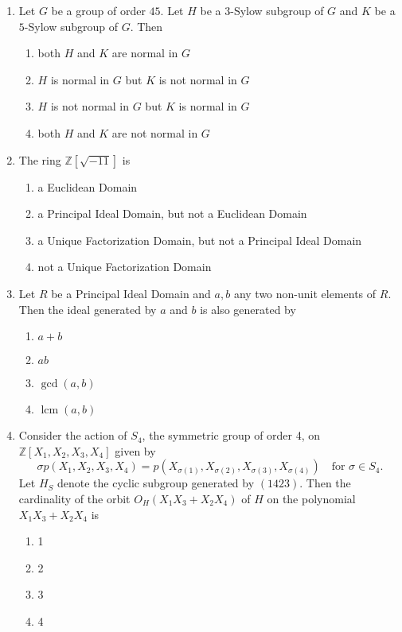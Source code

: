 \documentclass[journal]{IEEEtran}
\numberwithin{equation}{enumi}
\numberwithin{figure}{enumi}
\begin{document}
\begin{enumerate}
\item
Let $G$ be a group of order $45$. Let $H$ be a $3$-Sylow subgroup of $G$ and $K$ be a $5$-Sylow subgroup of $G$. Then
\hfill{}
\begin{enumerate}
    \item both $H$ and $K$ are normal in $G$
    \item $H$ is normal in $G$ but $K$ is not normal in $G$
    \item $H$ is not normal in $G$ but $K$ is normal in $G$
    \item both $H$ and $K$ are not normal in $G$
\end{enumerate}

\item
The ring $\mathbb{Z}[\sqrt{-11}]$ is
\hfill{}
\begin{enumerate}
    \item a Euclidean Domain
    \item a Principal Ideal Domain, but not a Euclidean Domain
    \item a Unique Factorization Domain, but not a Principal Ideal Domain
    \item not a Unique Factorization Domain
\end{enumerate}

\item
Let $R$ be a Principal Ideal Domain and $a, b$ any two non-unit elements of $R$. Then the ideal generated by $a$ and $b$ is also generated by
\hfill{}
\begin{multicols}{4}
\begin{enumerate}
    \item $a + b$
    \item $ab$
    \item $\gcd(a, b)$
    \item $\operatorname{lcm}(a, b)$
\end{enumerate}
\end{multicols}

\item
Consider the action of $S_4$, the symmetric group of order 4, on $\mathbb{Z}[X_1,X_2,X_3,X_4]$ given by
\[
\sigma p(X_1,X_2,X_3,X_4) = p(X_{\sigma(1)}, X_{\sigma(2)}, X_{\sigma(3)}, X_{\sigma(4)}) \quad \text{for } \sigma \in S_4.
\]
Let $H_S$ denote the cyclic subgroup generated by $(1423)$. Then the cardinality of the orbit $O_H(X_1X_3 + X_2X_4)$ of $H$ on the polynomial $X_1X_3 + X_2X_4$ is
\hfill{}
\begin{multicols}{4}
\begin{enumerate}
    \item 1
    \item 2
    \item 3
    \item 4
\end{enumerate}
\end{multicols}


\end{enumerate}
\end{document}
